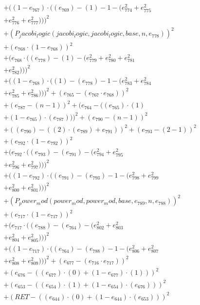 \documentclass[10pt, a4paper]{article}
\begin{document}
\begin{align*}
& + ((1 - e_{767})  \cdot  ((e_{769}) - (1) - 1 - (e_{774}^{2} + e_{775}^{2} \\
& + e_{776}^{2} + e_{777}^{2})))^{2} \\
& + (P_jacobi_logic(jacobi_logic, jacobi_logic, base, n, e_{778}))^{2} \\
& + (e_{768}  \cdot  (1 - e_{768}))^{2} \\
& + (e_{768}  \cdot  ((e_{778}) - (1) - (e_{779}^{2} + e_{780}^{2} + e_{781}^{2} \\
& + e_{782}^{2})))^{2} \\
& + ((1 - e_{768})  \cdot  ((1) - (e_{778}) - 1 - (e_{783}^{2} + e_{784}^{2} \\
& + e_{785}^{2} + e_{786}^{2})))^{2} + (e_{765} - (e_{767}  \cdot  e_{768}))^{2} \\
& + (e_{787} - (n - 1))^{2} + (e_{764} - ((e_{765})  \cdot  (1) \\
& + (1 - e_{765})  \cdot  (e_{787})))^{2} + (e_{790} - (n - 1))^{2} \\
& + ((e_{790}) - ((2)  \cdot  (e_{789}) + e_{791}))^{2} + (e_{793} - (2 - 1))^{2} \\
& + (e_{792}  \cdot  (1 - e_{792}))^{2} \\
& + (e_{792}  \cdot  ((e_{793}) - (e_{791}) - (e_{794}^{2} + e_{795}^{2} \\
& + e_{796}^{2} + e_{797}^{2})))^{2} \\
& + ((1 - e_{792})  \cdot  ((e_{791}) - (e_{793}) - 1 - (e_{798}^{2} + e_{799}^{2} \\
& + e_{800}^{2} + e_{801}^{2})))^{2} \\
& + (P_power_mod(power_mod, power_mod, base, e_{789}, n, e_{788}))^{2} \\
& + (e_{717}  \cdot  (1 - e_{717}))^{2} \\
& + (e_{717}  \cdot  ((e_{788}) - (e_{764}) - (e_{802}^{2} + e_{803}^{2} \\
& + e_{804}^{2} + e_{805}^{2})))^{2} \\
& + ((1 - e_{717})  \cdot  ((e_{764}) - (e_{788}) - 1 - (e_{806}^{2} + e_{807}^{2} \\
& + e_{808}^{2} + e_{809}^{2})))^{2} + (e_{677} - (e_{716}  \cdot  e_{717}))^{2} \\
& + (e_{676} - ((e_{677})  \cdot  (0) + (1 - e_{677})  \cdot  (1)))^{2} \\
& + (e_{653} - ((e_{654})  \cdot  (1) + (1 - e_{654})  \cdot  (e_{676})))^{2} \\
& + (RET - ((e_{644})  \cdot  (0) + (1 - e_{644})  \cdot  (e_{653})))^{2} \\

\end{align*}
\end{document}
